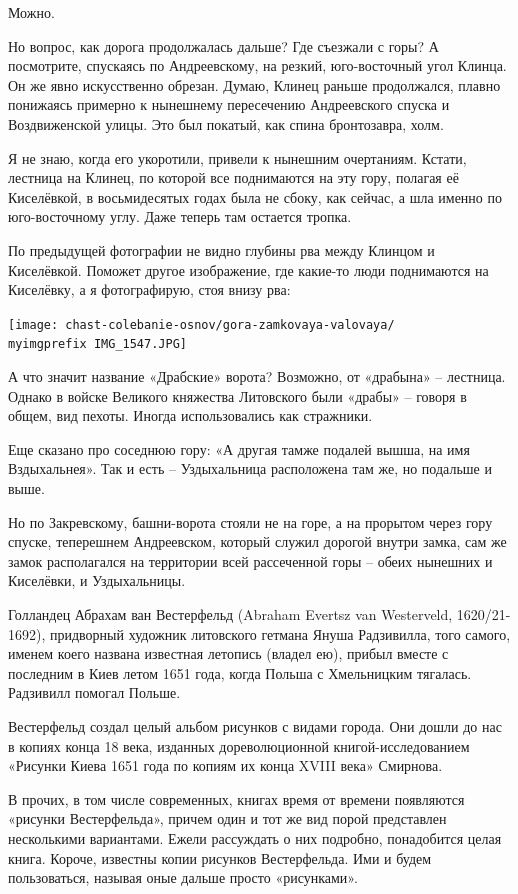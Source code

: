 Можно.

Но вопрос, как дорога продолжалась дальше? Где съезжали с горы? А посмотрите, спускаясь по Андреевскому, на резкий, юго-восточный угол Клинца. Он же явно искусственно обрезан. Думаю, Клинец раньше продолжался, плавно понижаясь примерно к нынешнему пересечению Андреевского спуска и Воздвиженской улицы. Это был покатый, как спина бронтозавра, холм.

Я не знаю, когда его укоротили, привели к нынешним очертаниям. Кстати, лестница на Клинец, по которой все поднимаются на эту гору, полагая её Киселёвкой, в восьмидесятых годах была не сбоку, как сейчас, а шла именно по юго-восточному углу. Даже теперь там остается тропка.

По предыдущей фотографии не видно глубины рва между Клинцом и Киселёвкой. Поможет другое изображение, где какие-то люди поднимаются на Киселёвку, а я фотографирую, стоя внизу рва:

\begin{center}
\texttt{[image: chast-colebanie-osnov/gora-zamkovaya-valovaya/\\myimgprefix IMG\_1547.JPG]}
\end{center}

А что значит название «Драбские» ворота? Возможно, от «драбына» – лестница. Однако в войске Великого княжества Литовского были «драбы» – говоря в общем, вид пехоты. Иногда использовались как стражники.

Еще сказано про соседнюю гору: «А другая тамже подалей вышша, на имя Вздыхальнея». Так и есть – Уздыхальница расположена там же, но подальше и выше.

Но по Закревскому, башни-ворота стояли не на горе, а на прорытом через гору спуске, теперешнем Андреевском, который служил дорогой внутри замка, сам же замок располагался на территории всей рассеченной горы – обеих нынешних и Киселёвки, и Уздыхальницы.

Голландец Абрахам ван Вестерфельд (Abraham Evertsz van Westerveld, 1620/21-1692), придворный художник литовского гетмана Януша Радзивилла, того самого, именем коего названа известная летопись (владел ею), прибыл вместе с последним в Киев летом 1651 года, когда Польша с Хмельницким тягалась. Радзивилл помогал Польше.

Вестерфельд создал целый альбом рисунков с видами города. Они дошли до нас в копиях конца 18 века, изданных дореволюционной книгой-исследованием «Рисунки Киева 1651 года по копиям их конца XVIII века» Смирнова.

В прочих, в том числе современных, книгах время от времени появляются «рисунки Вестерфельда», причем один и тот же вид порой представлен несколькими вариантами. Ежели рассуждать о них подробно, понадобится целая книга. Короче, известны копии рисунков Вестерфельда. Ими и будем пользоваться, называя оные дальше просто «рисунками».

